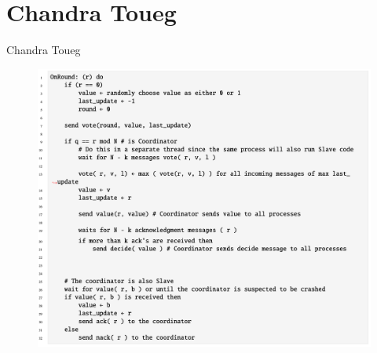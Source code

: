 \documentclass[11pt]{beamer}              %
\begin{document}
\section{Chandra Toueg}
\begin{frame}{Chandra Toueg}
\begin{figure}
    \centering
    \includegraphics[scale=0.3]{chandra-toueg.png}
    \label{fig:chandra_toueg_sudo}
\end{figure}


\end{frame}
\end{document}
